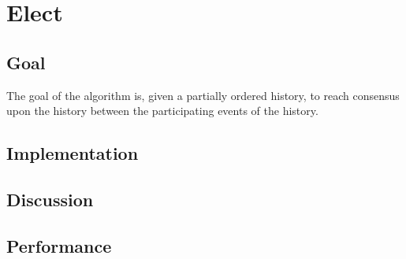 \section{Elect}
\subsection{Goal} %
The goal of the algorithm is, given a partially ordered history, to reach consensus upon the history between the participating events of the history.

\subsection{Implementation} %
\subsection{Discussion} %
\subsection{Performance} %

